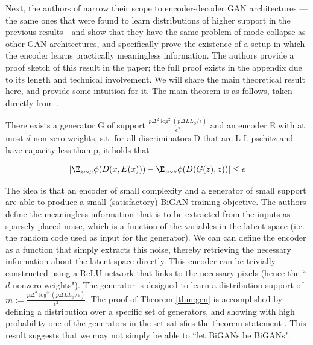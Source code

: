 
Next, the authors of \cite{arora2018do} narrow their scope to encoder-decoder GAN architectures \cite{dumoulin2016adversarially, donahue2016adversarial}---the same ones that were found to learn distributions of higher support in the previous results---and show that they have the same problem of mode-collapse as other GAN architectures, and specifically prove the existence of a setup in which the encoder learns practically meaningless information. The authors provide a proof sketch of this result in the paper; the full proof exists in the appendix due to its length and technical involvement. We will share the main theoretical result here, and provide some intuition for it. The main theorem is as follows, taken directly from \cite{arora2018do}.

\begin{theorem}
There exists a generator G of support $\frac{p\Delta^2 \log ^2 (p \Delta L L_\phi / \epsilon)}{\epsilon^2}$ and an encoder E with at most $\tilde{d}$ non-zero weights, s.t. for all discriminators D that are L-Lipschitz and have capacity less than p, it holds that

$$
| \E_{x \sim \mu} \phi ( D (x, E(x))) - \E_{z \sim \nu} \phi (D(G(z), z)) | \leq \epsilon
$$
\label{thm:gen}
\end{theorem}

The idea is that an encoder of small complexity and a generator of small support are able to produce a small (satisfactory) BiGAN training objective. The authors define the meaningless information that is to be extracted from the inputs as sparsely placed noise, which is a function of the variables in the latent space (i.e. the random code used as input for the generator). We can can define the encoder as a function that simply extracts this noise, thereby retrieving the necessary information about the latent space directly. This encoder can be trivially constructed using a ReLU network that links to the necessary pixels (hence the ``$\tilde{d}$ nonzero weights"). The generator is designed to learn a distribution support of $m := \frac{p\Delta^2 \log ^2 (p \Delta L L_\phi / \epsilon)}{\epsilon^2}$. The proof of Theorem \ref{thm:gen} is accomplished by defining a distribution over a specific set of generators, and showing with high probability one of the generators in the set satisfies the theorem statement \cite{arora2018do}. This result suggests that we may not simply be able to ``let BiGANs be BiGANs".
